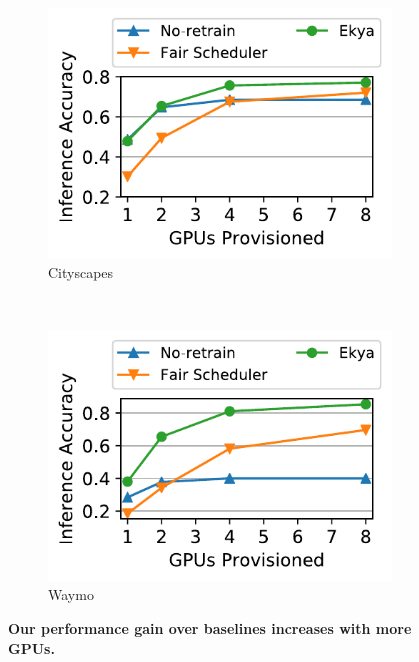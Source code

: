 \begin{figure}
  \centering
  \begin{subfigure}[t]{0.5\linewidth}
    \centering
    \includegraphics[width=\linewidth]{results/multicam/multicam_acc_vs_res_cityscapes.pdf} 
    \caption{Cityscapes}
    \label{fig:scalability-gpus-cityscapes}
  \end{subfigure}
  ~~~
  \begin{subfigure}[t]{0.5\linewidth}
    \centering
    \includegraphics[width=\linewidth]{results/multicam/multicam_acc_vs_res_waymo.pdf}
     \caption{Waymo}
    \label{fig:scalability-gpus-waymo}
  \end{subfigure}
  \caption{\bf Our performance gain over baselines increases with more GPUs. }
  \label{fig:scalability-gpus}
\end{figure}

